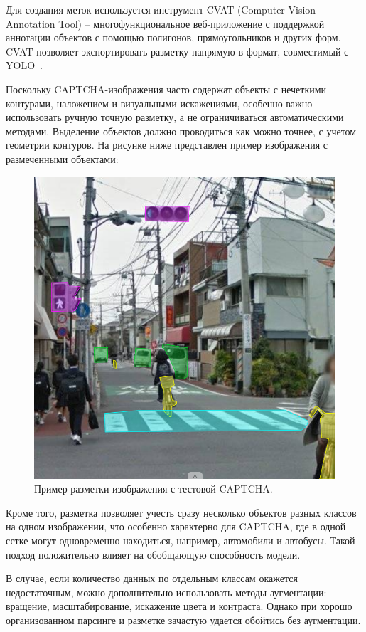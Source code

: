 Для создания меток используется инструмент CVAT (Computer Vision Annotation Tool) 
-- многофункциональное веб-приложение с поддержкой аннотации объектов с помощью 
полигонов, прямоугольников и других форм. CVAT позволяет экспортировать разметку 
напрямую в формат, совместимый с YOLO~\cite{CVAT}.

Поскольку CAPTCHA-изображения часто содержат объекты с нечеткими контурами, 
наложением и визуальными искажениями, особенно важно использовать ручную точную 
разметку, а не ограничиваться автоматическими методами. Выделение объектов должно 
проводиться как можно точнее, с учетом геометрии контуров. На рисунке ниже 
представлен пример изображения с размеченными объектами:

\begin{figure}[H]
    \centering
    \includegraphics[width=0.9\linewidth]{imgs/imagecaptcha/captcha-poligons.png}
    \caption{Пример разметки изображения с тестовой CAPTCHA.}
    \label{fig:mask-captcha}
\end{figure}
\vspace{-0.5cm}

Кроме того, разметка позволяет учесть сразу несколько объектов разных классов на 
одном изображении, что особенно характерно для CAPTCHA, где в одной сетке могут 
одновременно находиться, например, автомобили и автобусы. Такой подход 
положительно влияет на обобщающую способность модели.

В случае, если количество данных по отдельным классам окажется недостаточным, 
можно дополнительно использовать методы аугментации: вращение, масштабирование, 
искажение цвета и контраста. Однако при хорошо организованном парсинге и разметке 
зачастую удается обойтись без аугментации.

